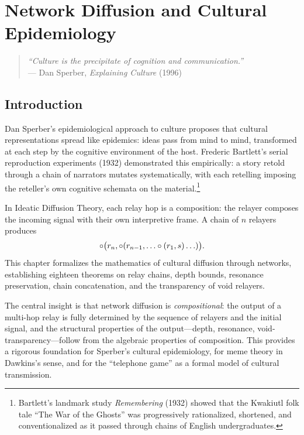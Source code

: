 \chapter{Network Diffusion and Cultural Epidemiology}
\label{ch:network}

\begin{quote}
\textit{``Culture is the precipitate of cognition and communication.''}\\
--- Dan Sperber, \textit{Explaining Culture} (1996)
\end{quote}

\vspace{1em}

\section{Introduction}

Dan Sperber's epidemiological approach to culture proposes that cultural
representations spread like epidemics: ideas pass from mind to mind,
transformed at each step by the cognitive environment of the host.  Frederic
Bartlett's serial reproduction experiments (1932) demonstrated this
empirically: a story retold through a chain of narrators mutates
systematically, with each retelling imposing the reteller's own cognitive
schemata on the material.\footnote{Bartlett's landmark study
\textit{Remembering} (1932) showed that the Kwakiutl folk tale ``The War of
the Ghosts'' was progressively rationalized, shortened, and
conventionalized as it passed through chains of English undergraduates.}

In Ideatic Diffusion Theory, each relay hop is a composition: the relayer
composes the incoming signal with their own interpretive frame.  A chain of
$n$ relayers produces
\[
  \circ\bigl(r_n, \circ(r_{n-1}, \ldots \circ(r_1, s) \ldots)\bigr).
\]
This chapter formalizes the mathematics of cultural diffusion through
networks, establishing eighteen theorems on relay chains, depth bounds,
resonance preservation, chain concatenation, and the transparency of void
relayers.

The central insight is that network diffusion is \emph{compositional}:
the output of a multi-hop relay is fully determined by the sequence of
relayers and the initial signal, and the structural properties of the
output---depth, resonance, void-transparency---follow from the algebraic
properties of composition.  This provides a rigorous foundation for
Sperber's cultural epidemiology, for meme theory in Dawkins's sense, and for
the ``telephone game'' as a formal model of cultural transmission.

